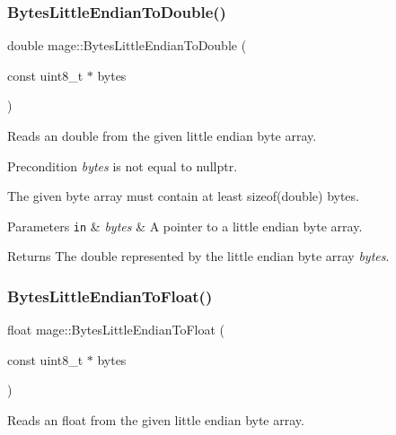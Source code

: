 \subsubsection{\texorpdfstring{Bytes\+Little\+Endian\+To\+Double()}{BytesLittleEndianToDouble()}}
{\footnotesize\ttfamily double mage\+::\+Bytes\+Little\+Endian\+To\+Double (\begin{DoxyParamCaption}\item[{const uint8\+\_\+t $\ast$}]{bytes }\end{DoxyParamCaption})\hspace{0.3cm}{\ttfamily [noexcept]}}

Reads an double from the given little endian byte array.

\begin{DoxyPrecond}{Precondition}
{\itshape bytes} is not equal to {\ttfamily nullptr}. 

The given byte array must contain at least {\ttfamily sizeof(double)} bytes. 
\end{DoxyPrecond}

\begin{DoxyParams}[1]{Parameters}
\mbox{\tt in}  & {\em bytes} & A pointer to a little endian byte array. \\
\hline
\end{DoxyParams}
\begin{DoxyReturn}{Returns}
The {\ttfamily double} represented by the little endian byte array {\itshape bytes}. 
\end{DoxyReturn}
\hypertarget{namespacemage_a833075fe8302c168037fd3ef2e9b9594}{}\label{namespacemage_a833075fe8302c168037fd3ef2e9b9594} 
\subsubsection{\texorpdfstring{Bytes\+Little\+Endian\+To\+Float()}{BytesLittleEndianToFloat()}}
{\footnotesize\ttfamily float mage\+::\+Bytes\+Little\+Endian\+To\+Float (\begin{DoxyParamCaption}\item[{const uint8\+\_\+t $\ast$}]{bytes }\end{DoxyParamCaption})\hspace{0.3cm}{\ttfamily [noexcept]}}

Reads an float from the given little endian byte array.

